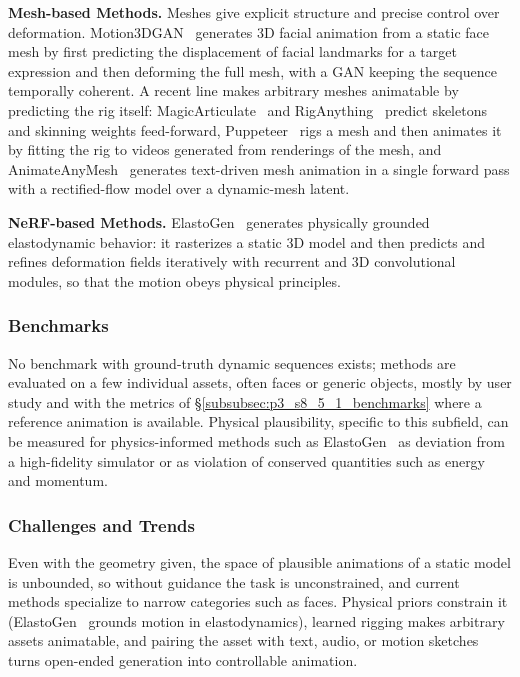 \textbf{Mesh-based Methods.} Meshes give explicit structure and precise control over deformation. Motion3DGAN~\cite{otberdout2022sparse} generates 3D facial animation from a static face mesh by first predicting the displacement of facial landmarks for a target expression and then deforming the full mesh, with a GAN keeping the sequence temporally coherent. A recent line makes arbitrary meshes animatable by predicting the rig itself: MagicArticulate~\cite{song2025magicarticulate} and RigAnything~\cite{liu2025riganything} predict skeletons and skinning weights feed-forward, Puppeteer~\cite{song2025puppeteer} rigs a mesh and then animates it by fitting the rig to videos generated from renderings of the mesh, and AnimateAnyMesh~\cite{wu2025animateanymesh} generates text-driven mesh animation in a single forward pass with a rectified-flow model over a dynamic-mesh latent.

\textbf{NeRF-based Methods.} ElastoGen~\cite{feng2024elastogen} generates physically grounded elastodynamic behavior: it rasterizes a static 3D model and then predicts and refines deformation fields iteratively with recurrent and 3D convolutional modules, so that the motion obeys physical principles.

\subsubsection{Benchmarks}
\label{subsubsec:p3_s8_5_4_benchmarks}
No benchmark with ground-truth dynamic sequences exists; methods are evaluated on a few individual assets, often faces or generic objects, mostly by user study and with the metrics of §\ref{subsubsec:p3_s8_5_1_benchmarks} where a reference animation is available. Physical plausibility, specific to this subfield, can be measured for physics-informed methods such as ElastoGen~\cite{feng2024elastogen} as deviation from a high-fidelity simulator or as violation of conserved quantities such as energy and momentum.

\subsubsection{Challenges and Trends}
\label{subsubsec:p3_s8_5_4_challenges}
Even with the geometry given, the space of plausible animations of a static model is unbounded, so without guidance the task is unconstrained, and current methods specialize to narrow categories such as faces.
Physical priors constrain it (ElastoGen~\cite{feng2024elastogen} grounds motion in elastodynamics), learned rigging makes arbitrary assets animatable, and pairing the asset with text, audio, or motion sketches turns open-ended generation into controllable animation.

